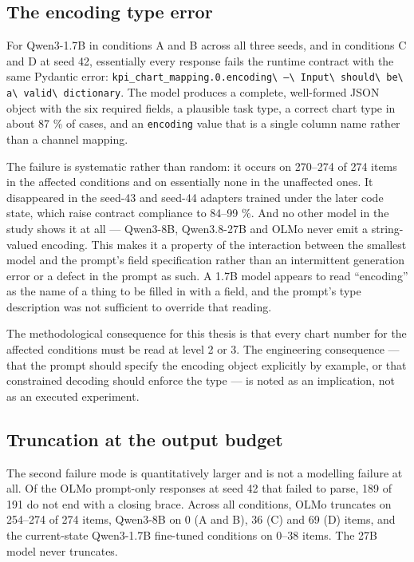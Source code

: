 \subsection{The encoding type error}

For Qwen3-1.7B in conditions A and B across all three seeds, and in conditions C and D at seed 42, essentially every response fails the runtime contract with the same Pydantic error: \nolinkurl{kpi_chart_mapping.0.encoding\ —\ Input\ should\ be\ a\ valid\ dictionary}. The model produces a complete, well-formed JSON object with the six required fields, a plausible task type, a correct chart type in about 87 \% of cases, and an \texttt{encoding} value that is a single column name rather than a channel mapping.

The failure is systematic rather than random: it occurs on 270--274 of 274 items in the affected conditions and on essentially none in the unaffected ones. It disappeared in the seed-43 and seed-44 adapters trained under the later code state, which raise contract compliance to 84--99 \%. And no other model in the study shows it at all --- Qwen3-8B, Qwen3.8-27B and OLMo never emit a string-valued encoding. This makes it a property of the interaction between the smallest model and the prompt's field specification rather than an intermittent generation error or a defect in the prompt as such. A 1.7B model appears to read ``encoding'' as the name of a thing to be filled in with a field, and the prompt's type description was not sufficient to override that reading.

The methodological consequence for this thesis is that every chart number for the affected conditions must be read at level 2 or 3. The engineering consequence --- that the prompt should specify the encoding object explicitly by example, or that constrained decoding should enforce the type \cite{willard2023guided,geng2025structured} --- is noted as an implication, not as an executed experiment.

\subsection{Truncation at the output budget}

The second failure mode is quantitatively larger and is not a modelling failure at all. Of the OLMo prompt-only responses at seed 42 that failed to parse, 189 of 191 do not end with a closing brace. Across all conditions, OLMo truncates on 254--274 of 274 items, Qwen3-8B on 0 (A and B), 36 (C) and 69 (D) items, and the current-state Qwen3-1.7B fine-tuned conditions on 0--38 items. The 27B model never truncates.

